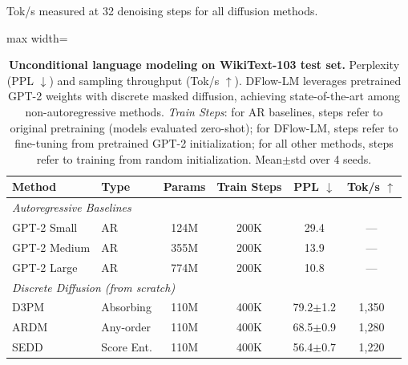 
\providecommand{\tbd}[1]{#1}
\providecommand{\best}[1]{\textbf{#1}}
\providecommand{\secondbest}[1]{\underline{#1}}

\begin{table}[t]
\centering
\caption{\textbf{Unconditional language modeling on WikiText-103 test set.} Perplexity (PPL $\downarrow$) and sampling throughput (Tok/s $\uparrow$). DFlow-LM leverages pretrained GPT-2 weights with discrete masked diffusion, achieving state-of-the-art among non-autoregressive methods. \textit{Train Steps}: for AR baselines, steps refer to original pretraining (models evaluated zero-shot); for DFlow-LM, steps refer to fine-tuning from pretrained GPT-2 initialization; for all other methods, steps refer to training from random initialization. Mean$\pm$std over 4 seeds.}
\label{tab:main_results}
\vspace{4pt}
{\footnotesize Tok/s measured at 32 denoising steps for all diffusion methods.}
\begin{adjustbox}{max width=\textwidth}
\begin{tabular}{@{}llcccc@{}}
\toprule
\textbf{Method} & \textbf{Type} & \textbf{Params} & \textbf{Train Steps} & \textbf{PPL $\downarrow$} & \textbf{Tok/s $\uparrow$} \\
\midrule
\multicolumn{6}{l}{\textit{Autoregressive Baselines}} \\
GPT-2 Small \citep{radford2019language}   & AR & 124M & 200K & 29.4 & --- \\
GPT-2 Medium \citep{radford2019language}  & AR & 355M & 200K & 13.9 & --- \\
GPT-2 Large \citep{radford2019language}   & AR & 774M & 200K & 10.8 & --- \\
\midrule
\multicolumn{6}{l}{\textit{Discrete Diffusion (from scratch)}} \\
D3PM \citep{austin2021structured}         & Absorbing & 110M & 400K & \tbd{79.2$\pm$1.2} & \tbd{1,350} \\
ARDM \citep{hoogeboom2022autoregressive}  & Any-order  & 110M & 400K & \tbd{68.5$\pm$0.9} & \tbd{1,280} \\
SEDD \citep{lou2024discrete}              & Score Ent. & 110M & 400K & \tbd{56.4$\pm$0.7} & \tbd{1,220} \\

\end{tabular}
\end{adjustbox}
\end{table}
